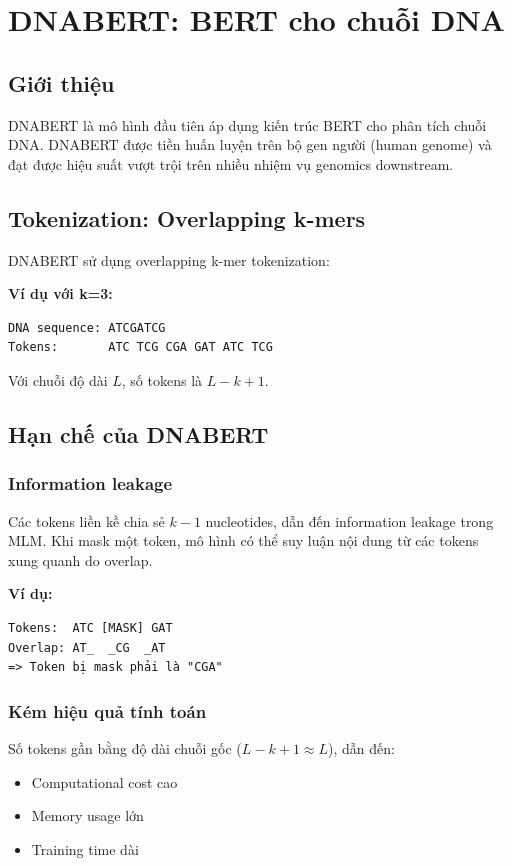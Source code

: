 \section{DNABERT: BERT cho chuỗi DNA}
\label{sec:dnabert}

\subsection{Giới thiệu}

DNABERT \cite{ji2021dnabert} là mô hình đầu tiên áp dụng kiến trúc BERT cho phân tích chuỗi DNA. DNABERT được tiền huấn luyện trên bộ gen người (human genome) và đạt được hiệu suất vượt trội trên nhiều nhiệm vụ genomics downstream.

\subsection{Tokenization: Overlapping k-mers}

DNABERT sử dụng overlapping k-mer tokenization:

\textbf{Ví dụ với k=3:}
\begin{verbatim}
DNA sequence: ATCGATCG
Tokens:       ATC TCG CGA GAT ATC TCG
\end{verbatim}

Với chuỗi độ dài $L$, số tokens là $L - k + 1$.

\subsection{Hạn chế của DNABERT}

\subsubsection{Information leakage}

Các tokens liền kề chia sẻ $k-1$ nucleotides, dẫn đến information leakage trong MLM. Khi mask một token, mô hình có thể suy luận nội dung từ các tokens xung quanh do overlap.

\textbf{Ví dụ:}
\begin{verbatim}
Tokens:  ATC [MASK] GAT
Overlap: AT_  _CG  _AT
=> Token bị mask phải là "CGA"
\end{verbatim}

\subsubsection{Kém hiệu quả tính toán}

Số tokens gần bằng độ dài chuỗi gốc ($L - k + 1 \approx L$), dẫn đến:
\begin{itemize}
    \item Computational cost cao
    \item Memory usage lớn
    \item Training time dài
\end{itemize}

